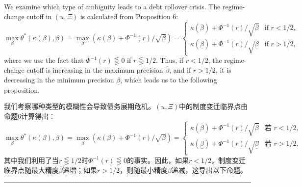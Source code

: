 \documentclass[12pt,a4paper]{article}
\newenvironment{original}
  {\par\medskip\noindent\color{black}\ignorespaces}
  {\par\medskip}
\newenvironment{translation}
  {\par\noindent\color{darkblue}\ignorespaces}
  {\par\medskip\noindent\hrule\par\medskip}
\theoremstyle{definition}
\theoremstyle{remark}
\begin{document}
\begin{original}
We examine which type of ambiguity leads to a debt rollover crisis. The regime-change cutoff in $(u, \Xi)$ is calculated from Proposition 6:
\[
\max_{\beta} \theta^*(\kappa(\beta), \beta) = \max_{\beta} \left(\kappa(\beta) + \Phi^{-1}(r)/\sqrt{\beta}\right) =
\begin{cases}
\kappa(\overline{\beta}) + \Phi^{-1}(r)/\sqrt{\overline{\beta}} & \text{if } r < 1/2,\\[4pt]
\kappa(\underline{\beta}) + \Phi^{-1}(r)/\sqrt{\underline{\beta}} & \text{if } r > 1/2,
\end{cases}
\]
where we use the fact that $\Phi^{-1}(r) \lesseqgtr 0$ if $r \lesseqgtr 1/2$. Thus, if $r < 1/2$, the regime-change cutoff is increasing in the maximum precision $\overline{\beta}$, and if $r > 1/2$, it is decreasing in the minimum precision $\underline{\beta}$, which leads us to the following proposition.
\end{original}
\begin{translation}
我们考察哪种类型的模糊性会导致债务展期危机。$(u, \Xi)$中的制度变迁临界点由命题6计算得出：
\[
\max_{\beta} \theta^*(\kappa(\beta), \beta) = \max_{\beta} \left(\kappa(\beta) + \Phi^{-1}(r)/\sqrt{\beta}\right) =
\begin{cases}
\kappa(\overline{\beta}) + \Phi^{-1}(r)/\sqrt{\overline{\beta}} & \text{若 } r < 1/2,\\[4pt]
\kappa(\underline{\beta}) + \Phi^{-1}(r)/\sqrt{\underline{\beta}} & \text{若 } r > 1/2,
\end{cases}
\]
其中我们利用了当$r \lesseqgtr 1/2$时$\Phi^{-1}(r) \lesseqgtr 0$的事实。因此，如果$r < 1/2$，制度变迁临界点随最大精度$\overline{\beta}$递增；如果$r > 1/2$，则随最小精度$\underline{\beta}$递减，这导出以下命题。
\end{translation}
\end{document}
